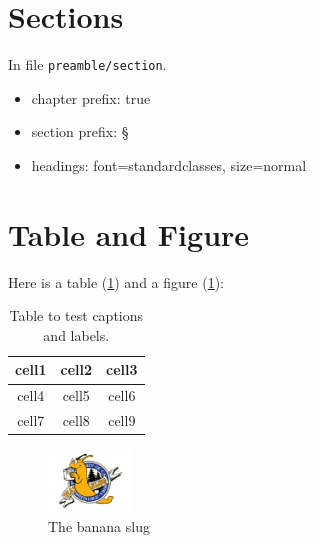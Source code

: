 \documentclass[%
	12pt, %
]{scrbook} %
\begin{document}
\section{Sections}
In file \texttt{preamble/section}.
\begin{itemize}
	\item chapter prefix: true 
	\item section prefix: \S
	\item headings: font=standardclasses, size=normal
\end{itemize}
\section{Table and Figure}
Here is a table (\cref{table:1}) and a figure (\cref{fig:logo}):
\begin{table}[h!]
	\centering
	\begin{tabular}{ c | c c }
		cell1 & cell2 & cell3 \\ 
		\hline
		cell4 & cell5 & cell6 \\  
		cell7 & cell8 & cell9    
	 \end{tabular}
	 \caption{Table to test captions and labels.}
	 \label{table:1}
\end{table}
\begin{figure}[h!]
	\centering
  \includegraphics[width=0.2\textwidth]{images/UCSC-logo.png}
  \caption{The banana slug}
  \label{fig:logo}
\end{figure}
\clearpage
\end{document}
